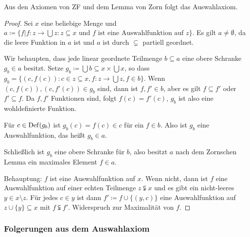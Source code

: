 \begin{satz}
	Aus den Axiomen von ZF und dem Lemma von Zorn folgt das Auswahlaxiom.
\end{satz}
\begin{proof}
	Sei $x$ eine beliebige Menge und $a\coloneqq\{f \vert f:z\to\bigcup z : z\subseteq x \text{ und } f \text{ ist eine Auswahlfunktion auf } z\}$.
	Es gilt $a\neq\emptyset$, da die leere Funktion in $a$ ist und $a$ ist durch $\subsetneq$ partiell geordnet.
	
	Wir behaupten, dass jede linear geordnete Teilmenge $b\subseteq a$ eine obere Schranke $g_b\in a$ besitzt. Setze $g_b\coloneqq \bigcup b\subseteq x\times \bigcup x$, so dass $g_b=\{(c, f(c)) : c\in z\subseteq x, f:z\to\bigcup z, f\in b\}$. Wenn $(c,f(c)),(c,f'(c))\in g_b$ sind, dann ist $f, f'\in b$, aber es gilt $f\subseteq f'$ oder $f'\subseteq f$. Da $f,f'$ Funktionen sind, folgt $f(c)=f'(c)$, $g_b$ ist also eine wohldefinierte Funktion.
	
	Für $c\in \operatorname{Def}(g_b)$ ist $g_b(c)=f(c)\in c$ für ein $f\in b$. Also ist $g_b$ eine Auswahlfunktion, das heißt $g_b\in a$.
	
	Schließlich ist $g_b$ eine obere Schranke für $b$, also besitzt $a$ nach dem Zornschen Lemma ein maximales Element $f\in a$.
	
	Behauptung: $f$ ist eine Auswahlfunktion auf $x$. Wenn nicht, dann ist $f$ eine Auswahlfunktion auf einer echten Teilmenge $z\subsetneqq x$ und es gibt ein nicht-leeres $y\in x\setminus z$. Für jedes $c\in y$ ist dann $f'\coloneqq f\cup\{(y,c)\}$ eine Auswahlfunktion auf $z\cup\{y\}\subseteq x$ mit $f\subsetneqq f'$. Widerspruch zur Maximalität von $f$.
\end{proof}

\subsubsection{Folgerungen aus dem Auswahlaxiom}

